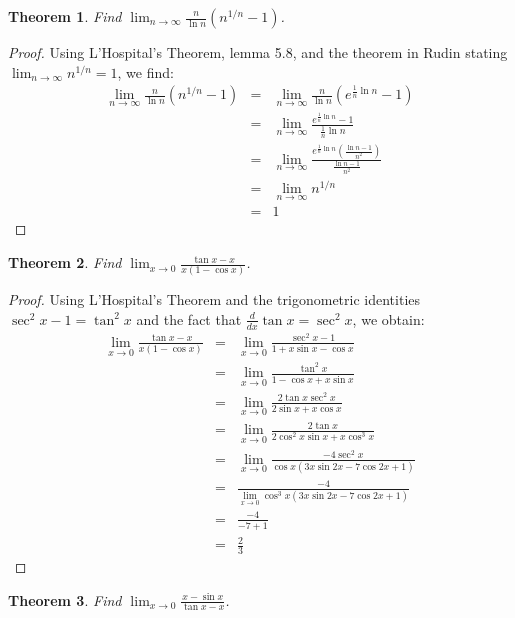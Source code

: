 \documentclass[psamsfonts]{amsart}
\newtheorem{thm}{Theorem}[section]
\theoremstyle{definition}
\theoremstyle{remark}
\numberwithin{equation}{section}
\begin{document}
\begin{thm}
Find $\lim_{n \to \infty} \frac{n}{\ln n} (n^{1/n} - 1)$. 
\end{thm}

\begin{proof}
Using L'Hospital's Theorem, lemma 5.8, and the theorem in Rudin stating $\lim_{n \to \infty} n^{1/n} = 1$, we find:
\begin{eqnarray}
\lim_{n \to \infty} \frac{n}{\ln n} (n^{1/n} -1) &=& \lim_{n \to \infty} \frac{n}{\ln n} (e^{\frac{1}{n} \ln n} - 1)\\
&=&  \lim_{n \to \infty} \frac{ e^{\frac{1}{n} \ln n} - 1}{\frac{1}{n} \ln n} \\
&=& \lim_{n \to \infty} \frac{ e^{\frac{1}{n} \ln n} \left( \frac{\ln n - 1}{n^2} \right) }{ \frac{\ln n - 1}{n^2}} \\
&=& \lim_{n \to \infty} n^{1/n} \\
&=& 1
\end{eqnarray}
\end{proof}

\begin{thm}
Find $\lim_{x \to 0} \frac{ \tan x - x}{x ( 1 - \cos x)}$. 
\end{thm}

\begin{proof}
Using L'Hospital's Theorem and the trigonometric identities $\sec^2 x - 1 = \tan^2 x$ and the fact that $\frac{d}{dx} \tan x = \sec^2 x$, we obtain:
\begin{eqnarray}
\lim_{x \to 0} \frac{\tan x - x}{x(1 - \cos x)} &=& \lim_{x \to 0} \frac{ \sec^2 x - 1}{1 + x \sin x - \cos x} \\
&=& \lim_{x \to 0} \frac{ \tan^2 x}{1 - \cos x + x \sin x} \\
&=& \lim_{x \to 0} \frac{ 2 \tan x \sec^2 x}{2 \sin x + x \cos x} \\
&=& \lim_{x \to 0} \frac{ 2 \tan x}{2 \cos^2 x \sin x + x \cos^3 x} \\
&=& \lim_{x \to 0} \frac{-4 \sec^2 x}{\cos x (3 x \sin 2x - 7 \cos 2x + 1)} \\
&=& \frac{-4}{ \lim_{x \to 0} \cos^3 x (3x \sin 2x - 7 \cos 2x + 1)} \\
&=& \frac{-4}{-7 + 1} \\
&=& \frac{2}{3}
\end{eqnarray}
\end{proof}

\begin{thm}
Find $\lim_{x \to 0} \frac{x - \sin x}{\tan x - x}$.
\end{thm}
\end{document}
